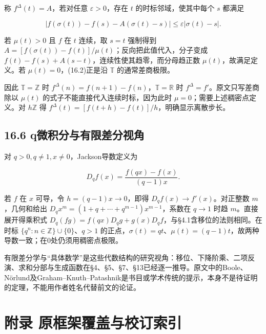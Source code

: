 \documentclass[11pt,a4paper]{article}
\begin{document}
称 \(f^\Delta(t)=A\)，若对任意 \(\varepsilon>0\)，存在 \(t\)
的时标邻域，使其中每个 \(s\) 都满足

\[
|f(\sigma(t))-f(s)-A(\sigma(t)-s)|\le\varepsilon|\sigma(t)-s|.\tag{16.2}
\]

若 \(\mu(t)>0\) 且 \(f\) 在 \(t\) 连续，取 \(s=t\) 强制得到
\(A=[f(\sigma(t))-f(t)]/\mu(t)\)；反向把此值代入，分子变成
\(f(t)-f(s)+A(s-t)\)，连续性使其趋零，而分母趋正数
\(\mu(t)\)，故满足定义。若 \(\mu(t)=0\)，(16.2)正是沿 \(\mathbb T\)
的通常差商极限。

因此 \(\mathbb T=\mathbb Z\) 时
\(f^\Delta(n)=f(n+1)-f(n)\)，\(\mathbb T=\mathbb R\) 时
\(f^\Delta=f'\)。原文只写差商除以 \(\mu(t)\)
的式子不能直接代入连续时标，因为此时 \(\mu=0\)；需要上述稠密点定义。对
\(h\mathbb Z\) 得 \(f^\Delta(t)=[f(t+h)-f(t)]/h\)，明确显示离散步长。

\subsection{16.6
q微积分与有限差分视角}\label{qux5faeux79efux5206ux4e0eux6709ux9650ux5deeux5206ux89c6ux89d2}

对 \(q>0,q\ne1,x\ne0\)，Jackson导数定义为

\[
D_qf(x)=\frac{f(qx)-f(x)}{(q-1)x}.
\]

若 \(f\) 在 \(x\) 可导，令 \(h=(q-1)x\to0\)，即得
\(D_qf(x)\to f'(x)\)。对正整数 \(m\)，几何和给出
\(D_qx^m=(1+q+\cdots+q^{m-1})x^{m-1}\)，系数在 \(q\to1\) 时趋
\(m\)。直接展开得乘积式
\(D_q(fg)=f(qx)D_qg+g(x)D_qf\)，与§4.1含移位的法则相同。在时标
\(\{q^n:n\in\mathbb Z\}\cup\{0\}\)、\(q>1\)
的正点，\(\sigma(t)=qt\)、\(\mu(t)=(q-1)t\)，故两种导数一致；在0处仍须用稠密点极限。

有限差分学与``具体数学''是这些代数结构的研究视角：移位、下降阶乘、二项反演、求和分部与生成函数在§4、§5、§7、§13已经逐一推导。原文中的Boole、Nörlund及Graham--Knuth--Patashnik是书目或学术传统的提示，本身不是待证明的定理，不能用作者姓名代替前文的论证。

\clearpage

\section{附录
原框架覆盖与校订索引}\label{ux9644ux5f55-ux539fux6846ux67b6ux8986ux76d6ux4e0eux6821ux8ba2ux7d22ux5f15}
\end{document}
